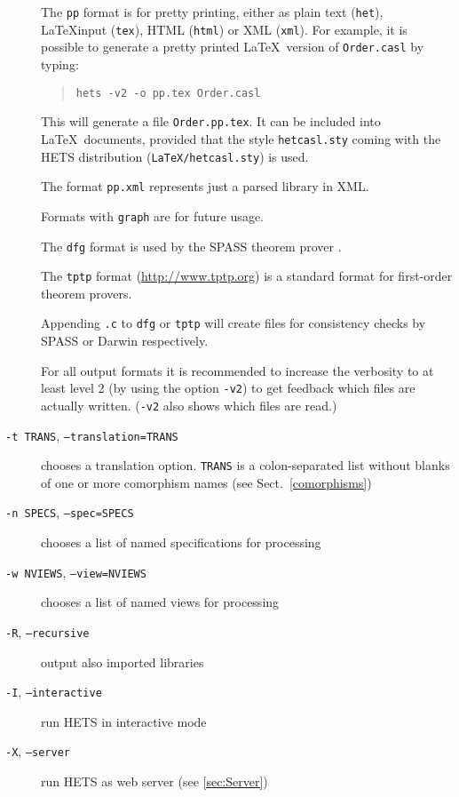 \documentclass{article}
\newcommand{\normalTEXTSC}[2]{{#1\scriptsize#2}}
\newcommand     {\Hets}{\normalTEXTSC{H}{ETS}\xspace}
\newcommand     {\SPASS}{\normalTEXTSC{S}{PASS}\xspace}
\begin{document}
\begin{description}
The \texttt{pp} format is for pretty printing, either as plain text
(\texttt{het}), \LaTeX input (\texttt{tex}), HTML (\texttt{html}) or XML
(\texttt{xml}).  For example, it is possible to generate a pretty printed
\LaTeX\ version of \texttt{Order.casl} by typing:

\begin{quote}
\texttt{hets -v2 -o pp.tex Order.casl}
\end{quote}

This will generate a file \texttt{Order.pp.tex}. It can be included
into \LaTeX\ documents, provided that the style \texttt{hetcasl.sty}
coming with the \Hets distribution (\texttt{LaTeX/hetcasl.sty}) is used.

The format \texttt{pp.xml} represents just a parsed library in XML.

Formats with \texttt{graph} are for future usage.

The \texttt{dfg} format is used by the \SPASS theorem prover
\cite{WeidenbachEtAl02}.

The \texttt{tptp} format (\url{http://www.tptp.org}) is a standard
format for first-order theorem provers.

Appending \texttt{.c} to \texttt{dfg} or \texttt{tptp} will create files for
consistency checks by SPASS or Darwin respectively.

For all output formats it is recommended to increase the verbosity to at least
level 2 (by using the option \texttt{-v2}) to get feedback which files are
actually written. (\texttt{-v2} also shows which files are read.)

\item[\texttt{-t TRANS}, \texttt{--translation=TRANS}]
chooses a translation option. \texttt{TRANS} is a colon-separated list
without blanks of one or more comorphism names (see Sect.~\ref{comorphisms})

\item[\texttt{-n SPECS}, \texttt{--spec=SPECS}]
chooses a list of named specifications for processing

\item[\texttt{-w NVIEWS}, \texttt{--view=NVIEWS}]
chooses a list of named views for processing

\item[\texttt{-R}, \texttt{--recursive}] output also imported libraries

\item[\texttt{-I}, \texttt{--interactive}] run \Hets in interactive mode

\item[\texttt{-X}, \texttt{--server}] run \Hets as web server (see
  \ref{sec:Server})


\end{description}
\end{document}
